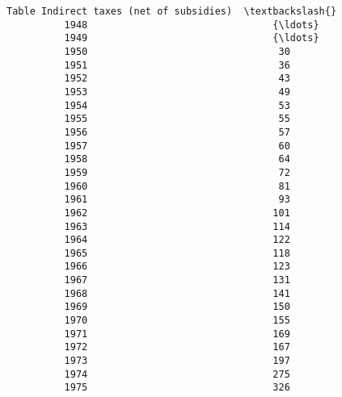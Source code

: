 \documentclass[11pt]{article}
\begin{document}
\begin{Verbatim}[commandchars=\\\{\}]
          Table Indirect taxes (net of subsidies)  \textbackslash{}
          1948                                {\ldots}   
          1949                                {\ldots}   
          1950                                 30   
          1951                                 36   
          1952                                 43   
          1953                                 49   
          1954                                 53   
          1955                                 55   
          1956                                 57   
          1957                                 60   
          1958                                 64   
          1959                                 72   
          1960                                 81   
          1961                                 93   
          1962                                101   
          1963                                114   
          1964                                122   
          1965                                118   
          1966                                123   
          1967                                131   
          1968                                141   
          1969                                150   
          1970                                155   
          1971                                169   
          1972                                167   
          1973                                197   
          1974                                275   
          1975                                326   
          

\end{Verbatim}
\end{document}
